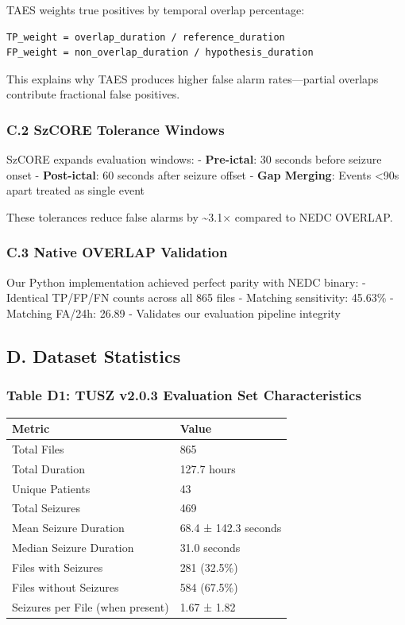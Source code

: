 \documentclass[
  10pt,
]{article}
\begin{document}
TAES weights true positives by temporal overlap percentage:

\begin{verbatim}
TP_weight = overlap_duration / reference_duration
FP_weight = non_overlap_duration / hypothesis_duration
\end{verbatim}

This explains why TAES produces higher false alarm rates---partial
overlaps contribute fractional false positives.

\hypertarget{c.2-szcore-tolerance-windows}{%
\subsubsection{C.2 SzCORE Tolerance
Windows}\label{c.2-szcore-tolerance-windows}}

SzCORE expands evaluation windows: - \textbf{Pre-ictal}: 30 seconds
before seizure onset - \textbf{Post-ictal}: 60 seconds after seizure
offset - \textbf{Gap Merging}: Events \textless90s apart treated as
single event

These tolerances reduce false alarms by \textasciitilde3.1× compared to
NEDC OVERLAP.

\hypertarget{c.3-native-overlap-validation}{%
\subsubsection{C.3 Native OVERLAP
Validation}\label{c.3-native-overlap-validation}}

Our Python implementation achieved perfect parity with NEDC binary: -
Identical TP/FP/FN counts across all 865 files - Matching sensitivity:
45.63\% - Matching FA/24h: 26.89 - Validates our evaluation pipeline
integrity

\hypertarget{d.-dataset-statistics}{%
\subsection{D. Dataset Statistics}\label{d.-dataset-statistics}}

\hypertarget{table-d1-tusz-v2.0.3-evaluation-set-characteristics}{%
\subsubsection{Table D1: TUSZ v2.0.3 Evaluation Set
Characteristics}\label{table-d1-tusz-v2.0.3-evaluation-set-characteristics}}

\begin{longtable}[]{@{}ll@{}}
\toprule
Metric & Value\tabularnewline
\midrule
\endhead
Total Files & 865\tabularnewline
Total Duration & 127.7 hours\tabularnewline
Unique Patients & 43\tabularnewline
Total Seizures & 469\tabularnewline
Mean Seizure Duration & 68.4 ± 142.3 seconds\tabularnewline
Median Seizure Duration & 31.0 seconds\tabularnewline
Files with Seizures & 281 (32.5\%)\tabularnewline
Files without Seizures & 584 (67.5\%)\tabularnewline
Seizures per File (when present) & 1.67 ± 1.82\tabularnewline
\bottomrule
\end{longtable}
\end{document}
